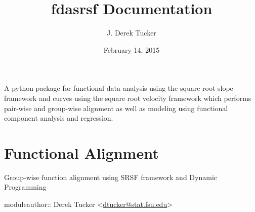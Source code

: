 \documentclass[letterpaper,10pt,english]{sphinxmanual}
\title{fdasrsf Documentation}
\date{February 14, 2015}
\author{J. Derek Tucker}
\begin{document}
\maketitle
\tableofcontents
{}\label{index::doc}


A python package for functional data analysis using the square root
slope framework and curves using the square root velocity framework
which performs pair-wise and group-wise alignment as well as modeling
using functional component analysis and regression.


\chapter{Functional Alignment}
\label{time_warping:module-time_warping}\label{time_warping:functional-alignment}\label{time_warping::doc}\label{time_warping:welcome-to-fdasrsf-s-documentation}
Group-wise function alignment using SRSF framework and Dynamic Programming

moduleauthor:: Derek Tucker \textless{}\href{mailto:dtucker@stat.fsu.edu}{dtucker@stat.fsu.edu}\textgreater{}
\end{document}
